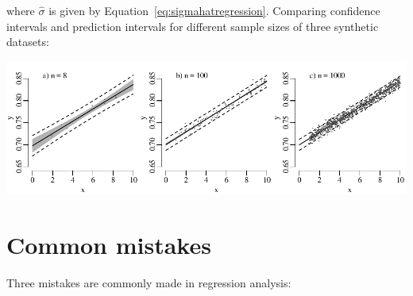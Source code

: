 \noindent where $\hat{\sigma}$ is given by
Equation~\ref{eq:sigmahatregression}. Comparing confidence intervals
and prediction intervals for different sample sizes of three synthetic
datasets:

\noindent\includegraphics[width=\textwidth]{../figures/prediction-interval.pdf}
\begingroup {}
\label{fig:prediction-interval}
\endgroup

\section{Common mistakes}
\label{sec:regression-caveats}

Three mistakes are commonly made in regression analysis:


